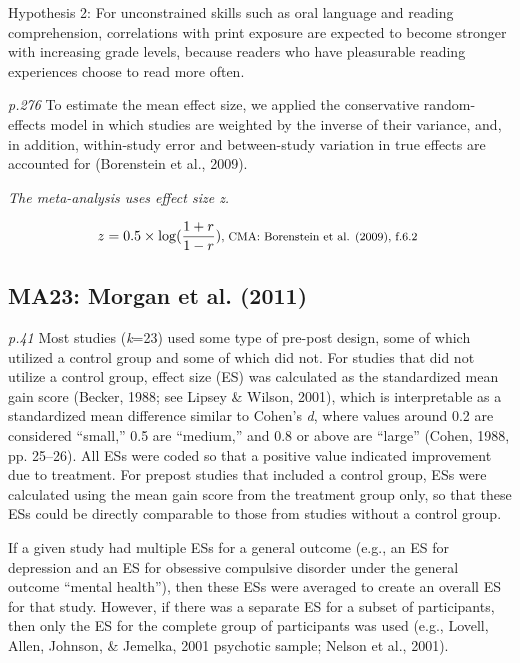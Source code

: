 \documentclass{article}
\begin{document}
Hypothesis 2: For unconstrained skills such as oral language and reading comprehension, correlations with print exposure are expected to become stronger with increasing grade levels, because readers who have pleasurable reading experiences
choose to read more often. 

\textit{p.276} To estimate the mean effect size, we applied the conservative random-effects model in which studies are weighted by the inverse of their variance, and, in addition, within-study error and between-study variation in true effects are accounted for (Borenstein et al., 2009).

\vspace{3mm}
\textit{The meta-analysis uses effect size z.}

\begin{equation*}
z= 0.5 \times \log (\frac{1+r}{1-r})  \mbox{\footnotesize, CMA: Borenstein et al. (2009), f.6.2  }
\end{equation*}

\subsection*{MA23: Morgan et al. (2011)}

\textit{p.41} Most studies (\textit{k}=23) used some type of pre-post design, some of which utilized a control group and some of which did not. For studies that did not utilize a control group, effect size (ES) was calculated as the standardized mean gain score (Becker, 1988; see Lipsey \& Wilson, 2001), which is interpretable as a standardized mean difference similar to Cohen’s \textit{d}, where values around 0.2 are considered “small,” 0.5 are “medium,” and 0.8 or above are “large” (Cohen, 1988, pp. 25–26). All ESs were coded so that a positive value indicated improvement due to treatment. For prepost studies that included a control group, ESs were calculated using the mean gain score from the treatment group only, so that these ESs could be directly comparable to those from studies without a control group.

If a given study had multiple ESs for a general outcome (e.g., an ES for depression and an ES for obsessive compulsive disorder under the general outcome “mental health”), then these ESs were averaged to create an overall ES for that study. However, if there was a separate ES for a subset of participants, then only the ES for the complete group of participants was used (e.g., Lovell, Allen, Johnson, \& Jemelka, 2001 psychotic sample; Nelson et al., 2001).
\end{document}
